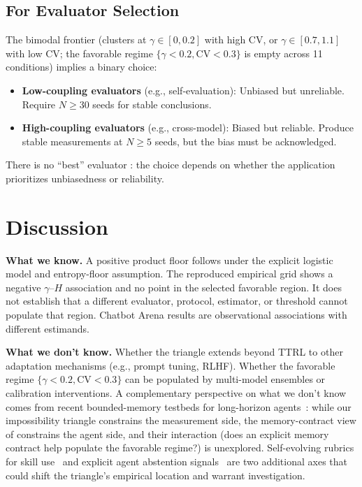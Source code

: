 \documentclass[11pt]{article}
\begin{document}
\subsection{For Evaluator Selection}

The bimodal frontier (clusters at $\gamma \in [0, 0.2]$ with high $\mathrm{CV}$, or $\gamma \in [0.7, 1.1]$ with low $\mathrm{CV}$; the favorable regime $\{\gamma < 0.2, \mathrm{CV} < 0.3\}$ is empty across 11 conditions) implies a binary choice:

\begin{itemize}[leftmargin=*,nosep]
 \item \textbf{Low-coupling evaluators} (e.g., self-evaluation): Unbiased but unreliable. Require $N \geq 30$ seeds for stable conclusions.
 \item \textbf{High-coupling evaluators} (e.g., cross-model): Biased but reliable. Produce stable measurements at $N \geq 5$ seeds, but the bias must be acknowledged.
\end{itemize}

There is no ``best'' evaluator : the choice depends on whether the application prioritizes unbiasedness or reliability.

\section{Discussion}

\textbf{What we know.} A positive product floor follows under the explicit logistic model and entropy-floor assumption. The reproduced empirical grid shows a negative $\gamma$--$H$ association and no point in the selected favorable region. It does not establish that a different evaluator, protocol, estimator, or threshold cannot populate that region. Chatbot Arena results are observational associations with different estimands.

\textbf{What we don't know.} Whether the triangle extends beyond TTRL to other adaptation mechanisms (e.g., prompt tuning, RLHF). Whether the favorable regime $\{\gamma < 0.2, \mathrm{CV} < 0.3\}$ can be populated by multi-model ensembles or calibration interventions. A complementary perspective on what we don't know comes from recent bounded-memory testbeds for long-horizon agents~\cite{cheng2026agenticsts}: while our impossibility triangle constrains the measurement side, the memory-contract view of \citet{cheng2026agenticsts} constrains the agent side, and their interaction (does an explicit memory contract help populate the favorable regime?) is unexplored. Self-evolving rubrics for skill use~\cite{zhu2026skillcoach} and explicit agent abstention signals~\cite{luo2026abstention} are two additional axes that could shift the triangle's empirical location and warrant investigation.
\end{document}
